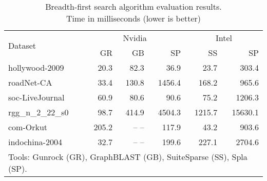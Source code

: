 \begin{table}[h]
\caption{Breadth-first search algorithm evaluation results.\\Time in milliseconds (lower is better)} 
\begin{center}
    \begin{tabular}{|l|r|r|r|r|r|}
    \hline
    \multirow{2}{*}{Dataset} & \multicolumn{3}{c|}{Nvidia} & \multicolumn{2}{c|}{Intel} \\
    \cline{2-6}
    & GR & GB & SP & SS & SP \\
    \hline
    \hline
    \rowcolor{black!10} hollywood-2009    &  20.3 &  82.3 &   36.9 &   23.7 &   303.4 \\
    \rowcolor{black!2 } roadNet-CA        &  33.4 & 130.8 & 1456.4 &  168.2 &   965.6 \\
    \rowcolor{black!10} soc-LiveJournal   &  60.9 &  80.6 &   90.6 &   75.2 &  1206.3 \\
    \rowcolor{black!2 } rgg\_n\_2\_22\_s0 &  98.7 & 414.9 & 4504.3 & 1215.7 & 15630.1 \\
    \rowcolor{black!10} com-Orkut         & 205.2 & -- -- &  117.9 &   43.2 &   903.6 \\
    \rowcolor{black!2 } indochina-2004    &  32.7 & -- -- &  199.6 &  227.1 &  2704.6 \\
    \hline
    \hline
    \multicolumn{6}{l}{Tools: Gunrock (GR), GraphBLAST (GB), SuiteSparse (SS), Spla (SP).} \\
    \end{tabular}
    \label{results:bfs}
\end{center}
\end{table}

